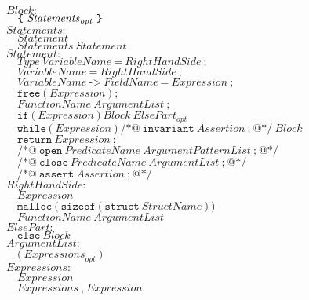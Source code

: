 \documentclass{article}
\begin{document}
\begin{flushleft}
$\mathit{Block{:}}$\\
$\quad \texttt{\symbol{123}}\ \mathit{Statements}_\mathit{opt}\ \texttt{\symbol{125}}$\\[5pt]

$\mathit{Statements{:}}$\\
$\quad \mathit{Statement}$\\
$\quad \mathit{Statements}\ \mathit{Statement}$\\[5pt]

$\mathit{Statement{:}}$\\
$\quad \mathit{Type}\ \mathit{VariableName}\ \texttt{=}\ \mathit{RightHandSide}\ \texttt{;}$\\
$\quad \mathit{VariableName}\ \texttt{=}\ \mathit{RightHandSide}\ \texttt{;}$\\
$\quad \mathit{VariableName}\ \texttt{->}\ \mathit{FieldName}\ \texttt{=}\ \mathit{Expression}\ \texttt{;}$\\
$\quad \texttt{free}\ \texttt{(}\ \mathit{Expression}\ \texttt{)}\ \texttt{;}$\\
$\quad \mathit{FunctionName}\ \mathit{ArgumentList}\ \texttt{;}$\\
$\quad \texttt{if}\ \texttt{(}\ \mathit{Expression}\ \texttt{)}\ \mathit{Block}\ \mathit{ElsePart}_\mathit{opt}$\\
$\quad \texttt{while}\ \texttt{(}\ \mathit{Expression}\ \texttt{)}\ \texttt{/*@}\ \texttt{invariant}\ \mathit{Assertion}\ \texttt{;}\ \texttt{@*/}\ \mathit{Block}$\\
$\quad \texttt{return}\ \mathit{Expression}\ \texttt{;}$\\
$\quad \texttt{/*@}\ \texttt{open}\ \mathit{PredicateName}\ \mathit{ArgumentPatternList}\ \texttt{;}\ \texttt{@*/}$\\
$\quad \texttt{/*@}\ \texttt{close}\ \mathit{PredicateName}\ \mathit{ArgumentList}\ \texttt{;}\ \texttt{@*/}$\\
$\quad \texttt{/*@}\ \texttt{assert}\ \mathit{Assertion}\ \texttt{;}\ \texttt{@*/}$\\[5pt]

$\mathit{RightHandSide{:}}$\\
$\quad \mathit{Expression}$\\
$\quad \texttt{malloc}\ \texttt{(}\ \texttt{sizeof}\ \texttt{(}\ \texttt{struct}\ \mathit{StructName}\ \texttt{)}\ \texttt{)}$\\
$\quad \mathit{FunctionName}\ \mathit{ArgumentList}$\\[5pt]

$\mathit{ElsePart{:}}$\\
$\quad \texttt{else}\ \mathit{Block}$\\[5pt]

$\mathit{ArgumentList{:}}$\\
$\quad \texttt{(}\ \mathit{Expressions}_\mathit{opt}\ \texttt{)}$\\[5pt]

$\mathit{Expressions{:}}$\\
$\quad \mathit{Expression}$\\
$\quad \mathit{Expressions}\ \texttt{,}\ \mathit{Expression}$\\[5pt]
\end{flushleft}
\end{document}
